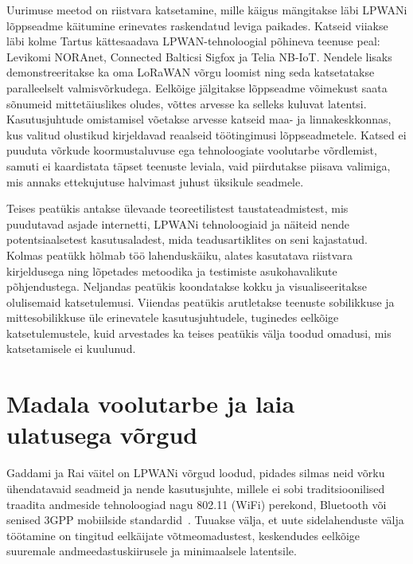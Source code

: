 \documentclass[12pt]{article}
\begin{document}
    Uurimuse meetod on riistvara katsetamine, mille käigus mängitakse läbi LPWANi lõppseadme käitumine erinevates raskendatud leviga paikades.
    Katseid viiakse läbi kolme Tartus kättesaadava LPWAN-tehnoloogial põhineva teenuse peal: Levikomi NORAnet, Connected Balticsi Sigfox ja Telia NB-IoT.
    Nendele lisaks demonstreeritakse ka oma LoRaWAN võrgu loomist ning seda katsetatakse paralleelselt valmisvõrkudega.
    Eelkõige jälgitakse lõppseadme võimekust saata sõnumeid mittetäiuslikes oludes, võttes arvesse ka selleks kuluvat latentsi.
    Kasutusjuhtude omistamisel võetakse arvesse katseid maa- ja linnakeskkonnas, kus valitud olustikud kirjeldavad reaalseid töötingimusi lõppseadmetele.
    Katsed ei puuduta võrkude koormustaluvuse ega tehnoloogiate voolutarbe võrdlemist, samuti ei kaardistata täpset teenuste leviala, vaid piirdutakse piisava valimiga, mis annaks ettekujutuse halvimast juhust üksikule seadmele.

    Teises peatükis antakse ülevaade teoreetilistest taustateadmistest, mis puudutavad asjade internetti, LPWANi tehnoloogiaid ja näiteid nende potentsiaalsetest kasutusaladest, mida teadusartiklites on seni kajastatud.
    Kolmas peatükk hõlmab töö lahenduskäiku, alates kasutatava riistvara kirjeldusega ning lõpetades metoodika ja testimiste asukohavalikute põhjendustega.
    Neljandas peatükis koondatakse kokku ja visualiseeritakse olulisemaid katsetulemusi.
    Viiendas peatükis arutletakse teenuste sobilikkuse ja mittesobilikkuse üle erinevatele kasutusjuhtudele, tuginedes eelkõige katsetulemustele, kuid arvestades ka teises peatükis välja toodud omadusi, mis katsetamisele ei kuulunud.

    \newpage


    \section{Madala voolutarbe ja laia ulatusega võrgud}

    Gaddami ja Rai väitel on LPWANi võrgud loodud, pidades silmas neid võrku ühendatavaid seadmeid ja nende kasutusjuhte, millele ei sobi traditsioonilised traadita andmeside tehnoloogiad nagu 802.11 (WiFi) perekond, Bluetooth või senised 3GPP mobiilside standardid~\cite{gaddam2018comparative}.
    Tuuakse välja, et uute sidelahenduste välja töötamine on tingitud eelkäijate võtmeomadustest, keskendudes eelkõige suuremale andmeedastuskiirusele ja minimaalsele latentsile.
\end{document}
